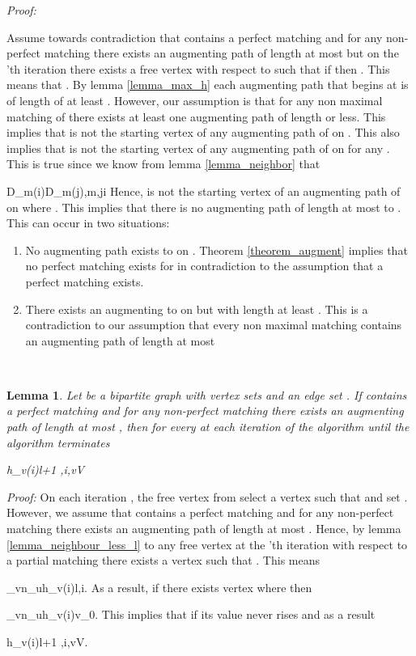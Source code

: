 \documentclass[11pt,onecolumn]{article}
\newcounter{theorem}
\newtheorem{lemma}[theorem]{Lemma}
\newcommand{\beq}{}
\newenvironment{proof}{\textit{Proof:}}{\hfill\\}
\begin{document}
\begin{proof}

Assume towards contradiction that  contains a perfect matching and for any non-perfect matching   there exists an augmenting path of length at most  but on the 'th iteration there exists a free vertex  with respect to  such that if  then . This means that . By lemma \ref{lemma_max_h} each augmenting path that begins at  is of length of at least . However, our assumption is that for any non maximal matching  of  there exists at least one augmenting path of length  or less. This implies that  is not the starting vertex of any augmenting path of  on . This also implies that  is not the starting vertex of any augmenting path of  on  for any . This is true since we know from lemma \ref{lemma_neighbor} that
\beq
D_{m}(i)\subseteq D_{m}(j),\forall m,\forall j\geq i
\eeq
 Hence,  is not the starting vertex of an augmenting path of  on  where . This implies that there is no augmenting path of length at most  to . This can occur in two situations:
  \begin {enumerate}
  \item No augmenting path exists to  on . Theorem \ref{theorem_augment} implies that no perfect matching exists for  in contradiction to the assumption that a perfect matching exists.
  \item There exists an augmenting to  on  but with length at least . This is a contradiction to our assumption that every non maximal matching contains an augmenting path of length at most 
  \end{enumerate}
\end{proof}
\begin{lemma}
\label{lemma_h_less_2l} Let  be a bipartite graph with vertex sets  and an edge set . If  contains a perfect matching and for any non-perfect matching  there exists an augmenting path of length at most , then for every  at each iteration of the algorithm until the algorithm terminates
\beq
h_v(i)\leq l+1 ,\forall i,v\in V
\eeq
\end{lemma}
\begin{proof}
On each iteration , the free vertex from  select a vertex  such that  and set . However, we assume that  contains a perfect matching and for any non-perfect matching  there exists an augmenting path of length at most . Hence, by lemma \ref{lemma_neighbour_less_l} to any free vertex at the 'th iteration with respect to a partial matching  there exists a vertex  such that . This means
\beq
\min_{v\in n_u}h_v(i)\leq l,\forall i.
\eeq
As a result, if there exists vertex  where  then
\beq
\arg\min_{v\in n_u}h_v(i)\neq v_0.
\eeq
This implies that if  its value never rises and as a result
\beq
h_v(i)\leq l+1 ,\forall i,v\in V.
\eeq
\end{proof}
\end{document}
